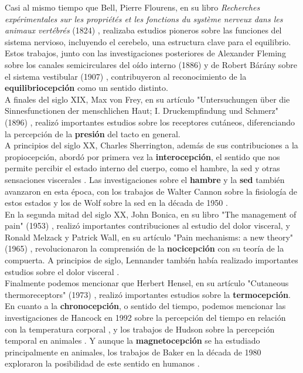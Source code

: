 \documentclass[conference]{IEEEtran}
\begin{document}
Casi al mismo tiempo que Bell, Pierre Flourens, en su libro \textit{Recherches expérimentales sur les propriétés et les fonctions du système nerveux dans les animaux vertébrés} (1824) \cite{flourens1824recherches}, realizaba estudios pioneros sobre las funciones del sistema nervioso, incluyendo el cerebelo, una estructura clave para el equilibrio.  Estos trabajos, junto con las investigaciones posteriores de Alexander Fleming sobre los canales semicirculares del oído interno (1886) \cite{fleming1886function} y de Robert Bárány sobre el sistema vestibular (1907) \cite{barany1907physiologie},  contribuyeron al reconocimiento de la \textbf{equilibriocepción} como un sentido distinto.\\

A finales del siglo XIX, Max von Frey,  en su artículo "Untersuchungen über die Sinnesfunctionen der menschlichen Haut; I. Druckempfindung und Schmerz" (1896) \cite{vonfrey1896untersuchungen},  realizó importantes estudios sobre los receptores cutáneos,  diferenciando la percepción de la \textbf{presión} del tacto en general.\\

A principios del siglo XX, Charles Sherrington, además de sus contribuciones a la propiocepción,  abordó por primera vez la \textbf{interocepción}, el sentido que nos permite percibir el estado interno del cuerpo, como el hambre, la sed y otras sensaciones viscerales \cite{sherrington1906integrative}.  Las investigaciones sobre el \textbf{hambre} y la \textbf{sed} también avanzaron en esta época, con los trabajos de Walter Cannon sobre la fisiología de estos estados \cite{cannon1915bodily} y los de Wolf sobre la sed en la década de 1950 \cite{wolf1950thirst}.\\

En la segunda mitad del siglo XX,  John Bonica, en su libro "The management of pain" (1953) \cite{bonica1953management},  realizó importantes contribuciones al estudio del dolor visceral, y Ronald Melzack y Patrick Wall, en su artículo "Pain mechanisms: a new theory" (1965) \cite{melzack1965},  revolucionaron la comprensión de la \textbf{nocicepción} con su teoría de la compuerta.  A principios de siglo,  Lennander  también había realizado importantes estudios sobre el dolor visceral \cite{lennander1902observations}.\\

Finalmente podemos mencionar que  Herbert Hensel, en su artículo "Cutaneous thermoreceptors" (1973) \cite{hensel1973},  realizó importantes estudios sobre la \textbf{termocepción}.  En cuanto a la \textbf{chronocepción}, o sentido del tiempo,  podemos mencionar las investigaciones de Hancock en 1992 sobre la percepción del tiempo en relación con la temperatura corporal \cite{hancock1992body}, y los trabajos de Hudson sobre la percepción temporal en animales \cite{hudson2003animal}.  Y aunque la \textbf{magnetocepción} se ha estudiado principalmente en animales,  los trabajos de Baker en la década de 1980 exploraron la posibilidad de este sentido en humanos \cite{baker1980goal}.\\
\end{document}
